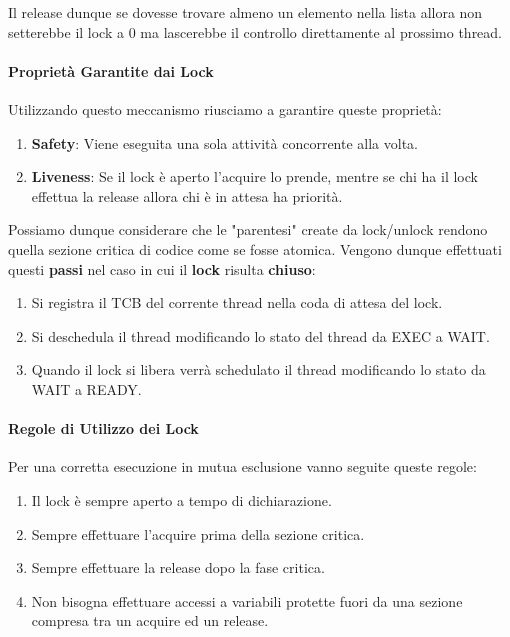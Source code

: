 \documentclass{article}
\begin{document}
Il release dunque se dovesse trovare almeno un elemento nella lista allora non setterebbe il lock a $0$ ma lascerebbe il controllo direttamente
al prossimo thread.

\paragraph{Proprietà Garantite dai Lock} Utilizzando questo meccanismo riusciamo a garantire queste proprietà:

\begin{enumerate}
    \item \textbf{Safety}: Viene eseguita una sola attività concorrente alla volta.
    \item \textbf{Liveness}: Se il lock è aperto l'acquire lo prende, mentre se chi ha il lock effettua la release allora chi è in attesa ha priorità.
\end{enumerate}

Possiamo dunque considerare che le "parentesi" create da lock/unlock rendono quella sezione critica di codice come se fosse atomica.
Vengono dunque effettuati questi \textbf{passi} nel caso in cui il \textbf{lock} risulta \textbf{chiuso}:

\begin{enumerate}
    \item Si registra il TCB del corrente thread nella coda di attesa del lock.
    \item Si deschedula il thread modificando lo stato del thread da EXEC a WAIT.
    \item Quando il lock si libera verrà schedulato il thread modificando lo stato da WAIT a READY.
\end{enumerate}

\paragraph{Regole di Utilizzo dei Lock} Per una corretta esecuzione in mutua esclusione vanno seguite queste regole:

\begin{enumerate}
    \item Il lock è sempre aperto a tempo di dichiarazione.
    \item Sempre effettuare l'acquire prima della sezione critica.
    \item Sempre effettuare la release dopo la fase critica.
    \item Non bisogna effettuare accessi a variabili protette fuori da una sezione compresa tra un acquire ed un release.
\end{enumerate}
\end{document}
